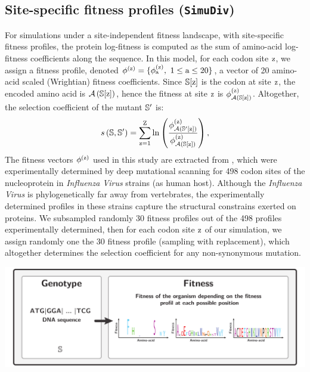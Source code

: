 \documentclass{article}
\begin{document}
	\subsection{Site-specific fitness profiles (\texttt{SimuDiv})}
	\label{subsec:independent-fitness-profiles}
	For simulations under a site-independent fitness landscape, with site-specific fitness profiles, the protein log-fitness is computed as the sum of amino-acid log-fitness coefficients along the sequence.
	In this model, for each {codon} site $\text{z}$, we assign a fitness profile, denoted $\phi^{(\text{z})} = \{ \phi^{(\text{z})}_{\text{a}},\ 1 \leq \text{a} \leq 20 \}$, a vector of 20 amino-acid scaled (Wrightian) fitness coefficients.
	Since $\mathbb{S}[ \text{z} ]$ is the {codon} at site $\text{z}$, the encoded amino acid is $\mathcal{A} \left( \mathbb{S}[ \text{z} ] \right)$, hence the fitness at site $\text{z}$ is $\phi^{(\text{z})}_{\mathcal{A} \left( \mathbb{S}[ \text{z} ] \right)}$.
	Altogether, the selection coefficient of the mutant $\mathbb{S}'$ is:
	\begin{equation}
		s \left( \mathbb{S},\mathbb{S}'\right) = \sum\limits_{\text{z}=1}^{\text{Z}} \ln \left( \dfrac{\phi^{(\text{z})}_{\mathcal{A} \left( \mathbb{S}'[ \text{z} ] \right)}}{\phi^{(\text{z})}_{\mathcal{A} \left( \mathbb{S}[ \text{z} ] \right)}} \right),
	\end{equation}
	The fitness vectors $\phi^{(\text{z})}$ used in this study are extracted from \citet{Bloom2017}, which were experimentally determined by deep mutational scanning for 498 codon sites of the nucleoprotein in \textit{Influenza Virus} strains (as human host).
	Although the \textit{Influenza Virus} is phylogenetically far away from vertebrates, the experimentally determined profiles in these strains capture the structural constrains exerted on proteins.
	We subsampled randomly 30 fitness profiles out of the 498 profiles experimentally determined, then for each {codon} site $\text{z}$ of our simulation, we assign randomly one the 30 fitness profile (sampling with replacement), which altogether determines the selection coefficient for any non-synonymous mutation.
	\begin{center}
		\includegraphics[width=\textwidth] {ModelSimuDiv}
	\end{center}
\end{document}
